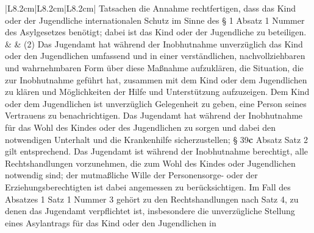 \documentclass[10pt,a4paper,landscape]{article}
\begin{document}
\begin{longtable}{|L{8.2cm}|L{8.2cm}|L{8.2cm}|}
Tatsachen  \newline die Annahme rechtfertigen, dass das Kind  \newline oder der Jugendliche internationalen  \newline Schutz im Sinne des \S{} 1 Absatz 1 Nummer   des Asylgesetzes benötigt; dabei ist das  \newline Kind oder der Jugendliche zu beteiligen. &  & (2) Das Jugendamt hat während der  \newline Inobhutnahme unverzüglich das Kind oder  \newline den Jugendlichen umfassend und in einer  \newline verständlichen, nachvollziehbaren und  \newline wahrnehmbaren Form über diese  \newline Maßnahme aufzuklären, die Situation, die  \newline zur Inobhutnahme geführt hat, zusammen  \newline mit dem Kind oder dem Jugendlichen zu  \newline klären und Möglichkeiten der Hilfe und  \newline Unterstützung aufzuzeigen. Dem Kind oder  \newline dem Jugendlichen ist unverzüglich  \newline Gelegenheit zu geben, eine Person seines  \newline Vertrauens zu benachrichtigen. Das  \newline Jugendamt hat während der Inobhutnahme  für das Wohl des Kindes oder des  \newline Jugendlichen zu sorgen und dabei den  \newline notwendigen Unterhalt und die  \newline Krankenhilfe sicherzustellen; \S{} \textcolor{diffgreen}{39}\textbf{\textcolor{diffgreen}{c}} Absatz   Satz 2 gilt entsprechend. Das Jugendamt  \newline ist während der Inobhutnahme berechtigt,  \newline alle Rechtshandlungen vorzunehmen, die  \newline zum Wohl des Kindes oder Jugendlichen  \newline notwendig sind; der mutmaßliche Wille der  \newline Personensorge- oder der  \newline Erziehungsberechtigten ist dabei  \newline angemessen zu berücksichtigen. Im Fall  \newline des Absatzes 1 Satz 1 Nummer 3 gehört  \newline zu den Rechtshandlungen nach Satz 4, zu  \newline denen das Jugendamt verpflichtet ist,  \newline insbesondere die unverzügliche Stellung  \newline eines Asylantrags für das Kind oder den  \newline Jugendlichen in 
\end{longtable}
\end{document}
